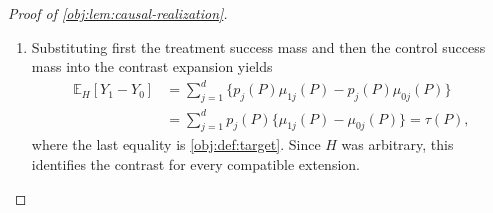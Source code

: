 \begin{proof}[Proof of \cref{obj:lem:causal-realization}]
\begin{enumerate}
Next suppose \(p_j(P)>0\). Model membership in
\cref{obj:def:model} supplies \cref{obj:ass:overlap}, so
\[
s_{1j}(P)=p_j(P)e_j(P)\ge\epsilon p_j(P)>0,
\qquad
s_{0j}(P)=p_j(P)\{1-e_j(P)\}\ge\epsilon p_j(P)>0.
\]
Dividing the preceding success identity by the positive arm mass
therefore gives
\[
\eta^H_{aj}
=p_j(P)\frac{q_{aj}(P)}{s_{aj}(P)}
=p_j(P)\mu_{aj}(P).
\]
The two cases establish this identity for every cell and both arms.

\item
Substituting first the treatment success mass and then the control
success mass into the contrast expansion yields
\[
\begin{aligned}
\mathbb E_H[Y_1-Y_0]
&=\sum_{j=1}^{d}
 \bigl\{p_j(P)\mu_{1j}(P)-p_j(P)\mu_{0j}(P)\bigr\}\\
&=\sum_{j=1}^{d}p_j(P)
 \bigl\{\mu_{1j}(P)-\mu_{0j}(P)\bigr\}
=\tau(P),
\end{aligned}
\]
where the last equality is \cref{obj:def:target}. Since \(H\) was
arbitrary, this identifies the contrast for every compatible
extension.
\end{enumerate}
\end{proof}
